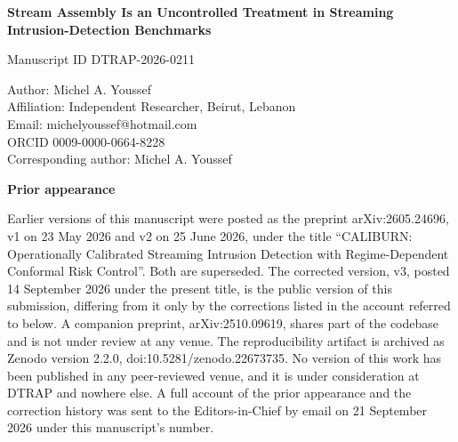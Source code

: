 \documentclass[11pt]{article}
\begin{document}
\begin{center}
{\Large\bfseries Stream Assembly Is an Uncontrolled Treatment in Streaming
Intrusion-Detection Benchmarks}

\vspace{0.8em}
Manuscript ID DTRAP-2026-0211
\end{center}

\vspace{1.2em}
Author: Michel A. Youssef\\
Affiliation: Independent Researcher, Beirut, Lebanon\\
Email: michelyoussef@hotmail.com\\
ORCID 0009-0000-0664-8228\\
Corresponding author: Michel A. Youssef

\vspace{1.2em}
{\large\bfseries Prior appearance}

Earlier versions of this manuscript were posted as the preprint
arXiv:2605.24696, v1 on 23 May 2026 and v2 on 25 June 2026, under the title
``CALIBURN: Operationally Calibrated Streaming Intrusion Detection with
Regime-Dependent Conformal Risk Control''. Both are superseded. The corrected
version, v3, posted 14 September 2026 under the present title, is the public
version of this submission, differing from it only by the corrections listed in
the account referred to below. A companion preprint, arXiv:2510.09619, shares
part of the codebase and is not under review at any venue. The reproducibility
artifact is archived as Zenodo version 2.2.0, doi:10.5281/zenodo.22673735. No
version of
this work has been published in any peer-reviewed venue, and it is under
consideration at DTRAP and nowhere else. A full account of the prior
appearance and the correction history was sent to the Editors-in-Chief by
email on 21 September 2026 under this manuscript's number.
\end{document}
